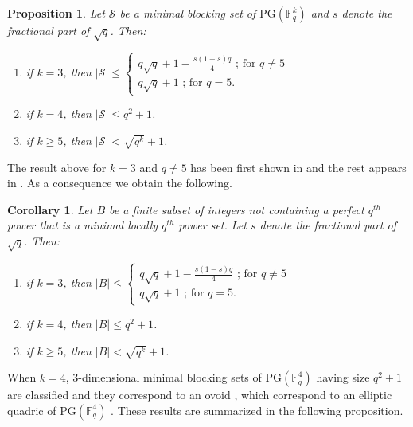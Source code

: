 \documentclass[12pt]{amsart}
\newtheorem{corollary}[theorem]{Corollary}
\newtheorem{proposition}[theorem]{Proposition}
\newcommand{\F}{{\mathbb F}}
\newcommand{\PG}{\mathrm{PG}}
\begin{document}
\begin{proposition}
Let $\mathcal{S}$ be a minimal blocking set of $\PG(\F_{q}^{k})$ and $s$ denote the fractional part of $\sqrt{q}$. Then:
\begin{enumerate}
        \item if $k=3$, then $\lvert \mathcal{S}   \rvert \leq \begin{cases} q \sqrt{q}+1 - \frac{s(1-s)q}{4} \text{ ; for } q \neq 5 \\ q \sqrt{q}+1 \text{ ; for } q = 5. \end{cases}$ \vspace{2mm}
        
        \item if $k=4$, then $\lvert \mathcal{S} \rvert \leq q^2+1$. \vspace{2mm}
        
        \item if $k\geq 5$, then $\lvert \mathcal{S} \rvert < \sqrt{q^{k}}+1$.
\end{enumerate}
\end{proposition}
The result above for $k = 3$ and $q \neq 5$ has been first shown in \cite{szHonyi2005large} and the rest appears in \cite[Theorem 1]{bruen1982hyperplane}. As a consequence we obtain the following.
\begin{corollary}
Let $B$ be a finite subset of integers not containing a perfect $q^{th}$ power that is a minimal locally $q^{th}$ power set. Let $s$ denote the fractional part of $\sqrt{q}$. Then:
\begin{enumerate}
        \item if $k=3$, then $\lvert B \rvert \leq \begin{cases} q \sqrt{q}+1 - \frac{s(1-s)q}{4} \text{ ; for } q \neq 5 \\ q \sqrt{q}+1 \text{ ; for } q = 5. \end{cases}$ \vspace{2mm}
        
        \item if $k=4$, then $\lvert B \rvert \leq q^2+1$. \vspace{2mm}
        
        \item if $k\geq 5$, then $\lvert B \rvert < \sqrt{q^{k}}+1$.
\end{enumerate}
\end{corollary}

When $k=4$, 3-dimensional minimal blocking sets of $\PG(\F_{q}^{4})$ having size $q^2+1$ are classified and they correspond to an ovoid \cite{bruen1982hyperplane}, which correspond to an elliptic quadric of $\PG(\F_{q}^{4})$ \cite{barlotti1955estensione,panella1955caratterizzazione}. These results are summarized in the following proposition. 
\end{document}
